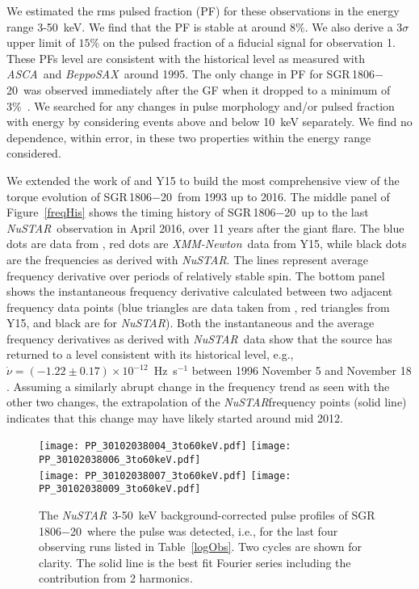 \documentclass[twocolumn]{aastex6}
\newcommand {\asca} {{\it ASCA}}
\newcommand {\sax} {{\it BeppoSAX}}
\newcommand {\xmm} {\textsl{XMM-Newton}}
\newcommand {\nustar} {\textsl{NuSTAR}}
\def \src {SGR\,1806$-$20}
\begin{document}
We estimated the rms pulsed fraction (PF) for these observations in
the energy range 3-50~keV. We find that the PF is stable at around
$8\%$. We also derive a 3$\sigma$ upper limit of $15\%$ on the pulsed
fraction of a fiducial signal for observation 1. These PFs level are
consistent with the historical level as measured with \asca\ and \sax\
around 1995. The only change in PF for \src\ was observed immediately
after the GF when it dropped to a minimum of 3\%\ \citep{rea05ApJ:1806,tiengo05:1806}.  
We searched for any changes in pulse morphology
and/or pulsed fraction with energy by considering events above and
below 10~keV separately. We find no dependence, within error, in these
two properties within the energy range considered.

We extended the work of \citet{woods07ApJ:1806} and Y15 to build the
most comprehensive view of the torque evolution of \src\ from 1993 up
to 2016. The middle panel of Figure~\ref{freqHis} shows the timing
history of \src\ up to the last \nustar\ observation in April 2016,
over 11 years after the giant flare. The blue dots are data from
\citet{woods07ApJ:1806}, red dots are \xmm\ data from Y15, while black
dots are the frequencies as derived with \nustar. The lines represent
average frequency derivative over periods of relatively stable spin.
The bottom panel shows the instantaneous frequency derivative
calculated between two adjacent frequency data points (blue triangles
are data taken from \citealt{woods07ApJ:1806}, red triangles from Y15,
and black are for \nustar). Both the instantaneous and the average
frequency derivatives as derived with \nustar\ data show that the source has 
returned to a level consistent with its historical level,
e.g., $\dot{\nu}=(-1.22\pm0.17)\times10^{-12}$~Hz~s$^{-1}$ between
1996 November 5 and November 18 \citep{woods00ApJ:1806}. Assuming a similarly abrupt change in the frequency trend as seen with the other two changes,  the extrapolation of the \nustar frequency points (solid line) indicates that this change may have likely started around mid 2012. 

\begin{figure}[t]
\begin{center}
\texttt{[image: PP\_30102038004\_3to60keV.pdf]}
\texttt{[image: PP\_30102038006\_3to60keV.pdf]}\\
\texttt{[image: PP\_30102038007\_3to60keV.pdf]}
\texttt{[image: PP\_30102038009\_3to60keV.pdf]}\\
\caption{The \nustar\ 3-50~keV background-corrected pulse profiles of
  \src\ where the pulse was detected, i.e., for the last four observing runs 
  listed in Table~\ref{logObs}. Two cycles are shown for
  clarity. The solid line is the best fit Fourier series including
  the contribution from 2 harmonics.}
\label{PPALL}
\end{center}
\end{figure}
\end{document}
